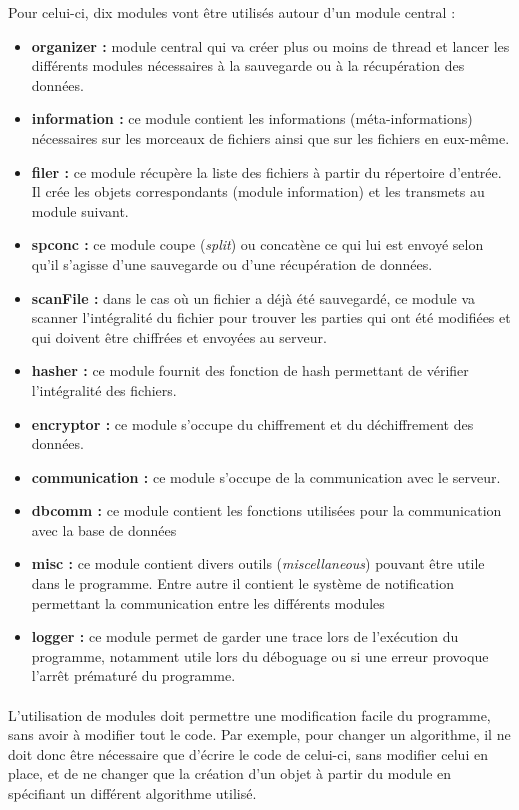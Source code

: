 \documentclass[a4paper,10pt, twoside]{report}
\begin{document}
\begin{spacing}{1.2}
Pour celui-ci, dix modules vont \^etre utilis\'es autour d'un module central :
\begin{itemize}
  \item \textbf{organizer :} module central qui va cr\'eer plus ou moins de
  thread et lancer les diff\'erents modules n\'ecessaires \`a la sauvegarde
  ou \`a la r\'ecup\'eration des donn\'ees.
  \item \textbf{information :} ce module contient les informations
  (m\'eta-informations) n\'ecessaires sur les morceaux de fichiers ainsi que
  sur les fichiers en eux-m\^eme.
  \item \textbf{filer :} ce module r\'ecup\`ere la liste des fichiers \`a
  partir du r\'epertoire d'entr\'ee. Il cr\'ee les objets correspondants
  (module information) et les transmets au module suivant.
  \item \textbf{spconc :} ce module coupe (\textit{split}) ou concat\`ene ce
  qui lui est envoy\'e selon qu'il s'agisse d'une sauvegarde ou d'une
  r\'ecup\'eration de donn\'ees.
  \item \textbf{scanFile :} dans le cas o\`u un fichier a d\'ej\`a \'et\'e
  sauvegard\'e, ce module va scanner l'int\'egralit\'e du fichier pour trouver
  les parties qui ont \'et\'e modifi\'ees et qui doivent \^etre chiffr\'ees et
  envoy\'ees au serveur.
  \item \textbf{hasher :} ce module fournit des fonction de hash permettant de
  v\'erifier l'int\'egralit\'e des fichiers.
  \item \textbf{encryptor :} ce module s'occupe du chiffrement et du
  d\'echiffrement des donn\'ees.
  \item \textbf{communication :} ce module s'occupe de la communication avec
  le serveur.
  \item \textbf{dbcomm :} ce module contient les fonctions utilis\'ees pour la
  communication avec la base de donn\'ees
  \item \textbf{misc :} ce module contient divers outils
  (\textit{miscellaneous}) pouvant \^etre utile dans le programme. Entre autre
  il contient le syst\`eme de notification permettant la communication entre
  les diff\'erents modules
  \item \textbf{logger :} ce module permet de garder une trace lors de
  l'ex\'ecution du programme, notamment utile lors du d\'eboguage ou si une
  erreur provoque l'arr\^et pr\'ematur\'e du programme.
\end{itemize}

\paragraph{}
L'utilisation de modules doit permettre une modification facile du programme,
sans avoir \`a modifier tout le code. Par exemple, pour changer un algorithme,
il ne doit donc \^etre n\'ecessaire que d'\'ecrire le code de celui-ci, sans
modifier celui en place, et de ne changer que la cr\'eation d'un objet \`a
partir du module en sp\'ecifiant un diff\'erent algorithme utilis\'e.


\end{spacing}
\end{document}
